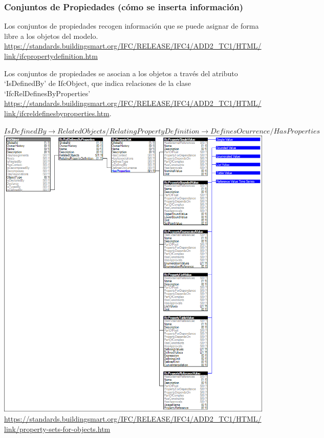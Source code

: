 \documentclass[spanish,10pt,a4paper,final,oneside]{article}
\begin{document}
\newpage
\subsubsection{Conjuntos de Propiedades (cómo se inserta información)}
Los conjuntos de propiedades recogen información que se puede asignar de forma libre a los objetos del modelo. \url{https://standards.buildingsmart.org/IFC/RELEASE/IFC4/ADD2_TC1/HTML/link/ifcpropertydefinition.htm}

Los conjuntos de propiedades se asocian a los objetos a través del atributo `IsDefinedBy' de IfcObject, que indica relaciones de la clase `IfcRelDefinesByProperties' \url{https://standards.buildingsmart.org/IFC/RELEASE/IFC4/ADD2_TC1/HTML/link/ifcreldefinesbyproperties.htm}. 

$IsDefinedBy \rightarrow RelatedObjects / RelatingPropertyDefinition \rightarrow DefinesOcurrence / HasProperties$
\\ \includegraphics[width=\textwidth]{property-sets-for-objects}
\\ \url{https://standards.buildingsmart.org/IFC/RELEASE/IFC4/ADD2_TC1/HTML/link/property-sets-for-objects.htm}
\end{document}
